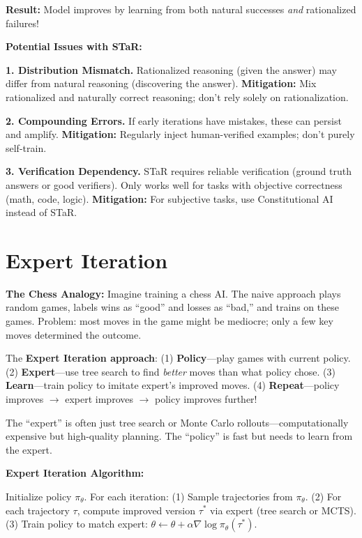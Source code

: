 \begin{chapterenv}
\textbf{Result:} Model improves by learning from both natural successes \textit{and} rationalized failures!

\begin{tipbox}
\textbf{Potential Issues with STaR:}

\textbf{1. Distribution Mismatch.} Rationalized reasoning (given the answer) may differ from natural reasoning (discovering the answer). \textbf{Mitigation:} Mix rationalized and naturally correct reasoning; don't rely solely on rationalization.

\textbf{2. Compounding Errors.} If early iterations have mistakes, these can persist and amplify. \textbf{Mitigation:} Regularly inject human-verified examples; don't purely self-train.

\textbf{3. Verification Dependency.} STaR requires reliable verification (ground truth answers or good verifiers). Only works well for tasks with objective correctness (math, code, logic). \textbf{Mitigation:} For subjective tasks, use Constitutional AI instead of STaR.
\end{tipbox}

\section{Expert Iteration}

\textbf{The Chess Analogy:} Imagine training a chess AI. The naive approach plays random games, labels wins as ``good'' and losses as ``bad,'' and trains on these games. Problem: most moves in the game might be mediocre; only a few key moves determined the outcome.

The \textbf{Expert Iteration approach}: (1) \textbf{Policy}---play games with current policy. (2) \textbf{Expert}---use tree search to find \textit{better} moves than what policy chose. (3) \textbf{Learn}---train policy to imitate expert's improved moves. (4) \textbf{Repeat}---policy improves $\to$ expert improves $\to$ policy improves further!

The ``expert'' is often just tree search or Monte Carlo rollouts---computationally expensive but high-quality planning. The ``policy'' is fast but needs to learn from the expert.

\begin{infobox}
\textbf{Expert Iteration Algorithm:}

Initialize policy $\pi_\theta$. For each iteration: (1) Sample trajectories from $\pi_\theta$. (2) For each trajectory $\tau$, compute improved version $\tau^*$ via expert (tree search or MCTS). (3) Train policy to match expert: $\theta \leftarrow \theta + \alpha \nabla \log \pi_\theta(\tau^*)$.


\end{infobox}
\end{chapterenv}
